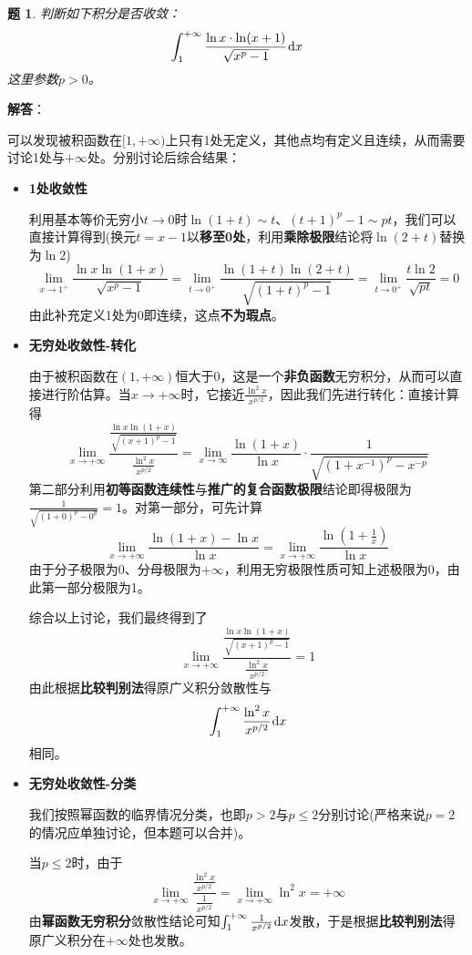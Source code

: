 \documentclass[a4paper,UTF8,fontset=windows,AutoFakeBold]{ctexart}
\newcommand*{\dr}{\hspace{0.07em}\mathrm{d}}
\theoremstyle{ex}
\newtheorem{exercise}{题}
\newcommand{\sol}[1]{{\vspace{5pt}\kaishu\noindent\textbf{解答}：\vspace{-3pt}
\begin{compactitem}
    \item[] #1
\end{compactitem}
}}
\begin{document}
\begin{framed}
\begin{exercise}
    判断如下积分是否收敛：
    $$\int_1^{+\infty}\frac{\ln x\cdot\ln(x+1)}{\sqrt{x^p-1}}\dr x$$
    这里参数$p>0$。
\end{exercise}
\sol{
    可以发现被积函数在$[1,+\infty)$上只有1处无定义，其他点均有定义且连续，从而需要讨论1处与$+\infty$处。分别讨论后综合结果：
    \begin{itemize}
        \item \textbf{1处收敛性}
        
        利用基本等价无穷小$t\to0$时$\ln(1+t)\sim t$、$(t+1)^p-1\sim pt$，我们可以直接计算得到(换元$t=x-1$以\textbf{移至0处}，利用\textbf{乘除极限}结论将$\ln(2+t)$替换为$\ln2$)
        $$\lim_{x\to1^+}\frac{\ln x\ln(1+x)}{\sqrt{x^p-1}}=\lim_{t\to0^+}\frac{\ln(1+t)\ln(2+t)}{\sqrt{(1+t)^p-1}}=\lim_{t\to0^+}\frac{t\ln 2}{\sqrt{pt}}=0$$
        由此补充定义1处为0即连续，这点\textbf{不为瑕点}。
        
        \item \textbf{无穷处收敛性-转化}

        由于被积函数在$(1,+\infty)$恒大于0，这是一个\textbf{非负函数}无穷积分，从而可以直接进行阶估算。当$x\to+\infty$时，它接近$\frac{\ln^2x}{x^{p/2}}$，因此我们先进行转化：直接计算得
        $$\lim_{x\to+\infty}\frac{\frac{\ln x\ln(1+x)}{\sqrt{(x+1)^p-1}}}{\frac{\ln^2x}{x^{p/2}}}=\lim_{x\to\infty}\frac{\ln(1+x)}{\ln x}\cdot\frac{1}{\sqrt{(1+x^{-1})^p-x^{-p}}}$$
        第二部分利用\textbf{初等函数连续性}与\textbf{推广的复合函数极限}结论即得极限为$\frac{1}{\sqrt{(1+0)^p-0^p}}=1$。对第一部分，可先计算
        $$\lim_{x\to+\infty}\frac{\ln(1+x)-\ln x}{\ln x}=\lim_{x\to+\infty}\frac{\ln(1+\frac{1}{x})}{\ln x}$$
        由于分子极限为0、分母极限为$+\infty$，利用无穷极限性质可知上述极限为0，由此第一部分极限为1。

        综合以上讨论，我们最终得到了
        $$\lim_{x\to+\infty}\frac{\frac{\ln x\ln(1+x)}{\sqrt{(x+1)^p-1}}}{\frac{\ln^2x}{x^{p/2}}}=1$$
        由此根据\textbf{比较判别法}得原广义积分敛散性与
        $$\int_1^{+\infty}\frac{\ln^2x}{x^{p/2}}\dr x$$
        相同。

        \item \textbf{无穷处收敛性-分类}
        
        我们按照幂函数的临界情况分类，也即$p>2$与$p\le2$分别讨论(严格来说$p=2$的情况应单独讨论，但本题可以合并)。

        当$p\le2$时，由于
        $$\lim_{x\to+\infty}\frac{\frac{\ln^2x}{x^{p/2}}}{\frac{1}{x^{p/2}}}=\lim_{x\to+\infty}\ln^2x=+\infty$$
        由\textbf{幂函数无穷积分}敛散性结论可知$\int_1^{+\infty}\frac{1}{x^{p/2}}\dr x$发散，于是根据\textbf{比较判别法}得原广义积分在$+\infty$处也发散。


\end{itemize}}
\end{framed}
\end{document}
